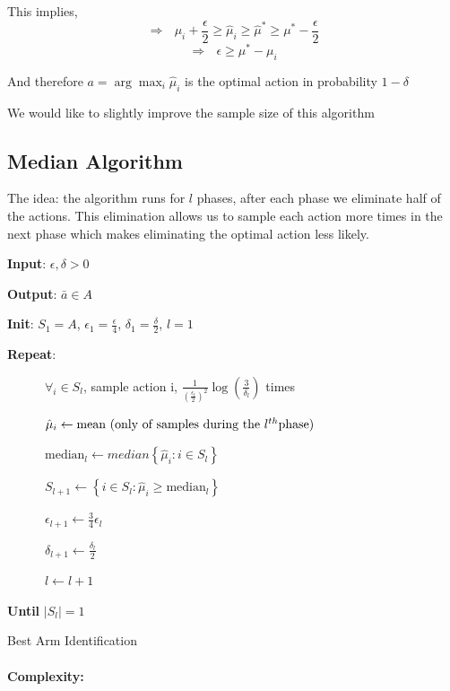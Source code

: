 This implies,
\[
\Rightarrow\text{ }\mu_{i}+\frac{\epsilon}{2}\ge\hat{\mu}_{i}\ge\hat{\mu}^{*}\ge\mu^{*}-\frac{\epsilon}{2}
\]
\[
\Rightarrow\text{ }\epsilon\ge\mu^{*}-\mu_{i}
\]

And therefore $a={\displaystyle \arg\max_{i}\hat{\mu}_{i}}$ is the
optimal action in probability $1-\delta$

We would like to slightly improve the sample size of this algorithm

\subsection{Median Algorithm}

The idea: the algorithm runs for $l$ phases, after each phase we
eliminate half of the actions. This elimination allows us to sample
each action more times in the next phase which makes eliminating the
optimal action less likely.

\begin{algorithm}
\textbf{Input}: $\epsilon,\delta>0$

\textbf{Output}: $\bar{a}\in A$

\textbf{Init}: $S_{1}=A$, $\epsilon_{1}=\frac{\epsilon}{4}$,
$\delta_{1}=\frac{\delta}{2}$, $l=1$

\textbf{Repeat}:

~~~~~~$\forall_{i}\in S_{l}$, sample action i, $\frac{1}{\left(\frac{\epsilon_{l}}{2}\right)^{2}}\log\left(\frac{3}{\delta_{l}}\right)$
times

~~~~~~$\hat{\mu}_{i}\leftarrow\text{mean (only of samples during the \ensuremath{l^{th}}phase)}$

~~~~~~$\text{median}_{l}\leftarrow median\left\{ \hat{\mu}_{i}:i\in S_{l}\right\} $

~~~~~~$S_{l+1}\leftarrow\left\{ i\in S_{l}:\hat{\mu}_{i}\ge\text{median}_{l}\right\} $

~~~~~~$\epsilon_{l+1}\leftarrow\frac{3}{4}\epsilon_{l}$

~~~~~~$\delta_{l+1}\leftarrow\frac{\delta_{l}}{2}$

~~~~~~$l\leftarrow l+1$

\textbf{Until} $\left|S_{l}\right|=1$

\caption{Best Arm Identification}
\end{algorithm}

\paragraph{Complexity:}

